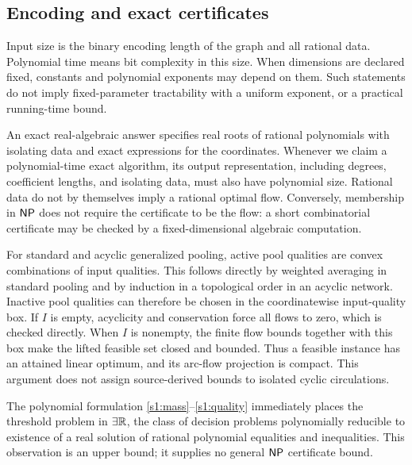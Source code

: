 \subsection{Encoding and exact certificates}\label{s1:encoding}

Input size is the binary encoding length of the graph and all rational
data. Polynomial time means bit complexity in this size. When dimensions
are declared fixed, constants and polynomial exponents may depend on
them. Such statements do not imply fixed-parameter tractability with a
uniform exponent, or a practical running-time bound.

An exact real-algebraic answer specifies real roots of rational
polynomials with isolating data and exact expressions for the coordinates.
Whenever we claim a polynomial-time exact algorithm, its output
representation, including degrees, coefficient lengths, and isolating
data, must also have polynomial size. Rational data do not by themselves
imply a rational optimal flow. Conversely, membership in $\mathsf{NP}$ does not
require the certificate to be the flow: a short combinatorial certificate
may be checked by a fixed-dimensional algebraic computation.

For standard and acyclic generalized pooling, active pool qualities are
convex combinations of input qualities. This follows directly by
weighted averaging in standard pooling and by induction in a topological
order in an acyclic network. Inactive pool qualities can therefore be
chosen in the coordinatewise input-quality box. If $I$ is empty, acyclicity
and conservation force all flows to zero, which is checked directly.
When $I$ is nonempty, the finite flow bounds together with this box make
the lifted feasible set closed and bounded. Thus a feasible instance
has an attained linear optimum, and its arc-flow projection is compact.
This argument does not assign source-derived bounds to isolated cyclic
circulations.

The polynomial formulation \eqref{s1:mass}--\eqref{s1:quality} immediately
places the threshold problem in $\exists\mathbb R$, the class of decision problems
polynomially reducible to existence of a real solution of rational
polynomial equalities and inequalities. This observation is an upper
bound; it supplies no general $\mathsf{NP}$ certificate bound.

